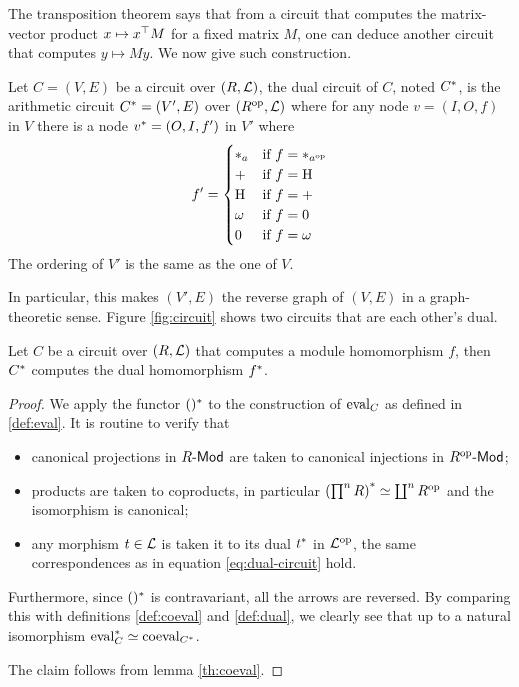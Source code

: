 The transposition theorem says that from a circuit that computes the
matrix-vector product $x\mapsto x^\top M$ for a fixed matrix $M$, one can
deduce another circuit that computes $y\mapsto My$. We now
give such construction.

\begin{definition}
  \label{def:dual}
  Let $C=(V,E)$ be a circuit over $(R,\mathcal{L})$, the dual circuit of
  $C$, noted $C^\ast$, is the arithmetic circuit $C^\ast = (V',
  E)$ over $(R^{\mathrm{op}},\mathcal{L})$ where for any node $v=(I,O,f)$ in $V$
  there is a node $v^\ast=(O,I,f')$ in $V'$ where
  \begin{equation}
    \label{eq:dual-circuit}
    f' = \begin{cases}
      *_{a} & \text{if $f = *_{a^{\mathrm{op}}}$}\\
      + & \text{if $f = \operatorname{H}$}\\
      \operatorname{H} & \text{if $f = +$}\\
      \omega & \text{if $f = 0$}\\
      0 & \text{if $f = \omega$}
    \end{cases}
  \end{equation}
  The ordering of $V'$ is the same as the one of $V$.
\end{definition}

In particular, this makes $(V',E)$ the reverse graph of $(V,E)$ in a
graph-theoretic sense. Figure \ref{fig:circuit} shows two circuits
that are each other's dual.

\begin{theorem}
  \label{th:tellegen}
  Let $C$ be a circuit over $(R,\mathcal{L})$ that computes a module
  homomorphism $f$, then $C^\ast$ computes the dual homomorphism
  $f^\ast$.
\end{theorem}
\begin{proof}
  We apply the functor $()^\ast$ to the construction of $\operatorname{eval}_C$ as
  defined in \ref{def:eval}. It is routine to verify that
  \begin{itemize}
  \item canonical projections in $R\text{\sf-Mod}$ are taken to canonical
    injections in $R^{\mathrm{op}}\text{\sf-Mod}$;
  \item products are taken to coproducts, in particular
    $\left(\prod^n R\right)^\ast \simeq \coprod^nR^{\mathrm{op}}$ and the isomorphism is canonical;
  \item any morphism $t\in\mathcal{L}$ is taken it to its dual $t^\ast$
    in $\mathcal{L}^{\mathrm{op}}$, the same correspondences as in equation
    \eqref{eq:dual-circuit} hold.
  \end{itemize}
  Furthermore, since $()^\ast$ is contravariant, all the arrows are
  reversed. By comparing this with definitions \ref{def:coeval} and
  \ref{def:dual}, we clearly see that up to a natural isomorphism
  $\operatorname{eval}_C^\ast\simeq\operatorname{coeval}_{C^\ast}$.

  The claim follows from lemma \ref{th:coeval}.
\end{proof}

